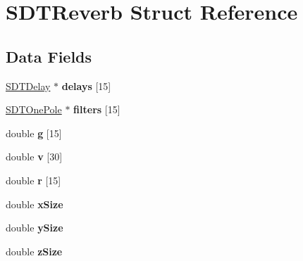 \hypertarget{struct_s_d_t_reverb}{}\section{S\+D\+T\+Reverb Struct Reference}
\label{struct_s_d_t_reverb}
\subsection*{Data Fields}
\begin{DoxyCompactItemize}
\item 
\hypertarget{struct_s_d_t_reverb_a8c6a778e69c8ddbfeca9575d51794201}{}\hyperlink{struct_s_d_t_delay}{S\+D\+T\+Delay} $\ast$ {\bfseries delays} \mbox{[}15\mbox{]}\label{struct_s_d_t_reverb_a8c6a778e69c8ddbfeca9575d51794201}

\item 
\hypertarget{struct_s_d_t_reverb_a7639fd20ccbd23496db66362c0c619a1}{}\hyperlink{struct_s_d_t_one_pole}{S\+D\+T\+One\+Pole} $\ast$ {\bfseries filters} \mbox{[}15\mbox{]}\label{struct_s_d_t_reverb_a7639fd20ccbd23496db66362c0c619a1}

\item 
\hypertarget{struct_s_d_t_reverb_a9f4064548c0ff099786a514865907d7f}{}double {\bfseries g} \mbox{[}15\mbox{]}\label{struct_s_d_t_reverb_a9f4064548c0ff099786a514865907d7f}

\item 
\hypertarget{struct_s_d_t_reverb_a2d4c85381fa7276b20e9841d002a7b94}{}double {\bfseries v} \mbox{[}30\mbox{]}\label{struct_s_d_t_reverb_a2d4c85381fa7276b20e9841d002a7b94}

\item 
\hypertarget{struct_s_d_t_reverb_a42a36099506752ba145e0a74bff25aaf}{}double {\bfseries r} \mbox{[}15\mbox{]}\label{struct_s_d_t_reverb_a42a36099506752ba145e0a74bff25aaf}

\item 
\hypertarget{struct_s_d_t_reverb_a176c5c9128af596b5f7a5d40767464ea}{}double {\bfseries x\+Size}\label{struct_s_d_t_reverb_a176c5c9128af596b5f7a5d40767464ea}

\item 
\hypertarget{struct_s_d_t_reverb_a787b0eeacea266cc9c28b5cba52e83a4}{}double {\bfseries y\+Size}\label{struct_s_d_t_reverb_a787b0eeacea266cc9c28b5cba52e83a4}

\item 
\hypertarget{struct_s_d_t_reverb_ac4f3f1c0f5ce6443b48e2a7ae6bfc19e}{}double {\bfseries z\+Size}\label{struct_s_d_t_reverb_ac4f3f1c0f5ce6443b48e2a7ae6bfc19e}


\end{DoxyCompactItemize}
